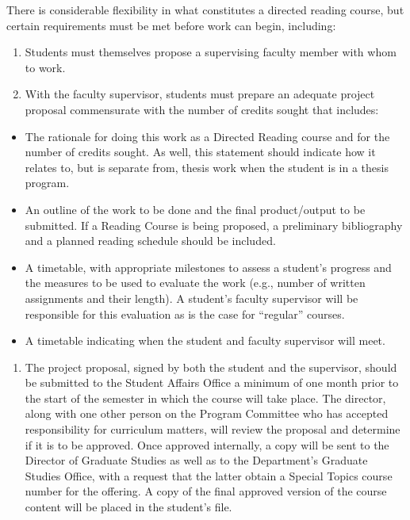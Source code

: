 \documentclass[
  openany]{book}
\providecommand{\tightlist}{%
  \setlength{\itemsep}{0pt}\setlength{\parskip}{0pt}}
\begin{document}
There is considerable flexibility in what constitutes a directed reading course, but certain requirements must be met before work can begin, including:

\begin{enumerate}
\def\labelenumi{\arabic{enumi}.}
\item
  Students must themselves propose a supervising faculty member with whom to work.
\item
  With the faculty supervisor, students must prepare an adequate project proposal commensurate with the number of credits sought that includes:
\end{enumerate}

\begin{itemize}
\item
  The rationale for doing this work as a Directed Reading course and for the number of credits sought. As well, this statement should indicate how it relates to, but is separate from, thesis work when the student is in a thesis program.
\item
  An outline of the work to be done and the final product/output to be submitted. If a Reading Course is being proposed, a preliminary bibliography and a planned reading schedule should be included.
\item
  A timetable, with appropriate milestones to assess a student's progress and the measures to be used to evaluate the work (e.g., number of written assignments and their length). A student's faculty supervisor will be responsible for this evaluation as is the case for ``regular'' courses.
\item
  A timetable indicating when the student and faculty supervisor will meet.
\end{itemize}

\begin{enumerate}
\def\labelenumi{\arabic{enumi}.}
\setcounter{enumi}{2}
\tightlist
\item
  The project proposal, signed by both the student and the supervisor, should be submitted to the Student Affairs Office a minimum of one month prior to the start of the semester in which the course will take place. The director, along with one other person on the Program Committee who has accepted responsibility for curriculum matters, will review the proposal and determine if it is to be approved. Once approved internally, a copy will be sent to the Director of Graduate Studies as well as to the Department's Graduate Studies Office, with a request that the latter obtain a Special Topics course number for the offering. A copy of the final approved version of the course content will be placed in the student's file.
\end{enumerate}
\end{document}
